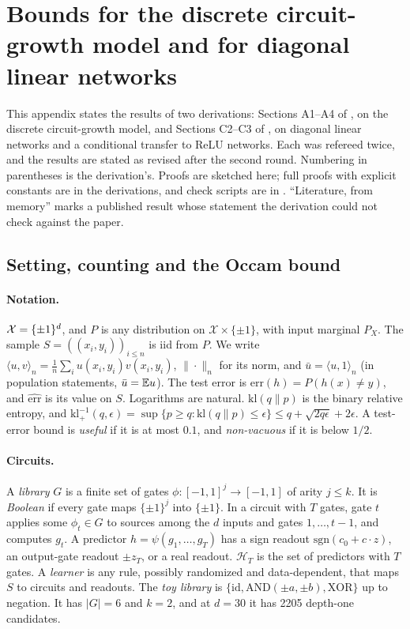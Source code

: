 \section{Bounds for the discrete circuit-growth model and for diagonal linear networks}
\label{app:discrete}

\begin{sloppypar}
This appendix states the results of two derivations: Sections A1--A4 of , on the discrete circuit-growth model, and Sections C2--C3 of , on diagonal linear networks and a conditional transfer to ReLU networks. Each was refereed twice, and the results are stated as revised after the second round. Numbering in parentheses is the derivation's. Proofs are sketched here; full proofs with explicit constants are in the derivations, and check scripts are in . ``Literature, from memory'' marks a published result whose statement the derivation could not check against the paper.
\end{sloppypar}

\subsection{Setting, counting and the Occam bound}\label{app:discrete:occam}

\paragraph{Notation.} $\mathcal X=\{\pm1\}^d$, and $P$ is any distribution on $\mathcal X\times\{\pm1\}$, with input marginal $P_X$. The sample $S=((x_i,y_i))_{i\le n}$ is iid from $P$. We write $\langle u,v\rangle_n=\frac1n\sum_iu(x_i,y_i)v(x_i,y_i)$, $\|\cdot\|_n$ for its norm, and $\bar u=\langle u,1\rangle_n$ (in population statements, $\bar u=\mathbb{E} u$). The test error is $\mathrm{err}(h)=P(h(x)\ne y)$, and $\widehat{\mathrm{err}}$ is its value on $S$. Logarithms are natural. $\mathrm{kl}(q\|p)$ is the binary relative entropy, and $\mathrm{kl}^{-1}_+(q,\epsilon)=\sup\{p\ge q:\mathrm{kl}(q\|p)\le\epsilon\}\le q+\sqrt{2q\epsilon}+2\epsilon$. A test-error bound is \emph{useful} if it is at most $0.1$, and \emph{non-vacuous} if it is below $1/2$.

\paragraph{Circuits.} A \emph{library} $G$ is a finite set of gates $\phi:[-1,1]^j\to[-1,1]$ of arity $j\le k$. It is \emph{Boolean} if every gate maps $\{\pm1\}^j$ into $\{\pm1\}$. In a circuit with $T$ gates, gate $t$ applies some $\phi_t\in G$ to sources among the $d$ inputs and gates $1,\dots,t-1$, and computes $g_t$. A predictor $h=\psi(g_1,\dots,g_T)$ has a sign readout $\mathrm{sgn}(c_0+c\cdot z)$, an output-gate readout $\pm z_T$, or a real readout. $\mathcal H_T$ is the set of predictors with $T$ gates. A \emph{learner} is any rule, possibly randomized and data-dependent, that maps $S$ to circuits and readouts. The \emph{toy library} is $\{\mathrm{id},\mathrm{AND}(\pm a,\pm b),\mathrm{XOR}\}$ up to negation. It has $|G|=6$ and $k=2$, and at $d=30$ it has 2205 depth-one candidates.

